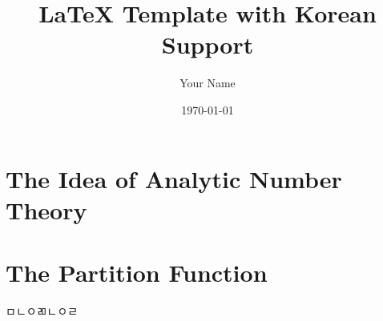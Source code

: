 \documentclass{book}
\title{LaTeX Template with Korean Support}
\author{Your Name}
\date{\today}
\begin{document}
\maketitle

\tableofcontents

\chapter{The Idea of Analytic Number Theory}\label{chap1}


\chapter{The Partition Function}\label{chap2}


ㅁㄴㅇㄻㄴㅇㄹ
\end{document}
